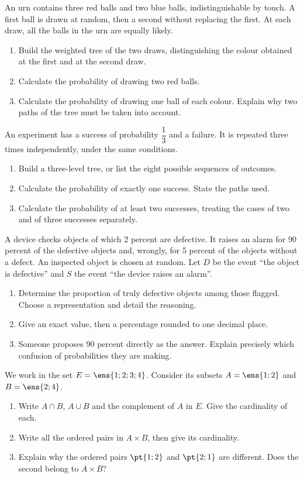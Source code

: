 An urn contains three red balls and two blue balls, indistinguishable by touch. A first ball is drawn at random, then a second without replacing the first. At each draw, all the balls in the urn are equally likely.
\begin{enumerate}[label=\arabic*.]
\item Build the weighted tree of the two draws, distinguishing the colour obtained at the first and at the second draw.
\item Calculate the probability of drawing two red balls.
\item Calculate the probability of drawing one ball of each colour. Explain why two paths of the tree must be taken into account.
\end{enumerate}
An experiment has a success of probability $\dfrac13$ and a failure. It is repeated three times independently, under the same conditions.
\begin{enumerate}[label=\arabic*.]
\item Build a three-level tree, or list the eight possible sequences of outcomes.
\item Calculate the probability of exactly one success. State the paths used.
\item Calculate the probability of at least two successes, treating the cases of two and of three successes separately.
\end{enumerate}
A device checks objects of which 2 percent are defective. It raises an alarm for 90 percent of the defective objects and, wrongly, for 5 percent of the objects without a defect. An inspected object is chosen at random. Let $D$ be the event ``the object is defective'' and $S$ the event ``the device raises an alarm''.
\begin{enumerate}[label=\arabic*.]
\item Determine the proportion of truly defective objects among those flagged. Choose a representation and detail the reasoning.
\item Give an exact value, then a percentage rounded to one decimal place.
\item Someone proposes 90 percent directly as the answer. Explain precisely which confusion of probabilities they are making.
\end{enumerate}
We work in the set $E=\ens{1;2;3;4}$. Consider its subsets $A=\ens{1;2}$ and $B=\ens{2;4}$.
\begin{enumerate}[label=\arabic*.]
\item Write $A\cap B$, $A\cup B$ and the complement of $A$ in $E$. Give the cardinality of each.
\item Write all the ordered pairs in $A\times B$, then give its cardinality.
\item Explain why the ordered pairs $\pt{1;2}$ and $\pt{2;1}$ are different. Does the second belong to $A\times B$?
\end{enumerate}
